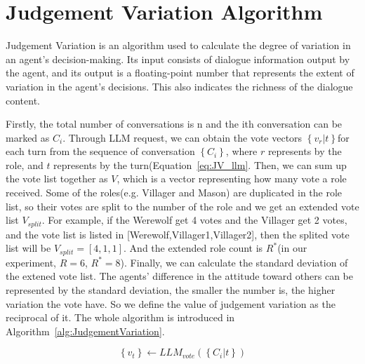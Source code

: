 \section{Judgement Variation Algorithm} \label{sec:Appendix_Evaulation_JudgementVariation}
Judgement Variation is an algorithm used to calculate the degree of variation in an agent's decision-making. Its input consists of dialogue information output by the agent, and its output is a floating-point number that represents the extent of variation in the agent's decisions. This also indicates the richness of the dialogue content.

Firstly, the total number of conversations is n and the ith conversation can be marked as $ C_i $. Through LLM request, we can obtain the vote vectors $ \left\{ v_r|t \right\} $for each turn from the sequence of conversation $ \left\{ C_{i} \right\} $, where $ r $ represents by the role, and $ t $ represents by the turn(Equation~\ref{eq:JV_llm}. Then, we can sum up the vote list together as $ V $, which is a vector representing how many vote a role received. Some of the roles(e.g. Villager and Mason) are duplicated in the role list, so their votes are split to the number of the role and we get an extended vote list $ V_{split} $. For example, if the Werewolf get 4 votes and the Villager get 2 votes, and the vote list is listed in [Werewolf,Villager1,Villager2], then the splited vote list will be $ V_{split} = [4,1,1] $. And the extended role count is $ R^* $(in our experiment, $ R = 6$, $ R^*=8 $). Finally, we can calculate the standard deviation of the extened vote list. The agents' difference in the attitude toward others can be represented by the standard deviation, the smaller the number is, the higher variation the vote have. So we define the value of judgement variation as the reciprocal of it. The whole algorithm is introduced in Algorithm~\ref{alg:JudgementVariation}.


\begin{equation}
    \left\{ v_t \right\} \leftarrow LLM_{vote}(\left\{ C_{i}|t \right\})
   \label{eq:JV_llm}
\end{equation}


